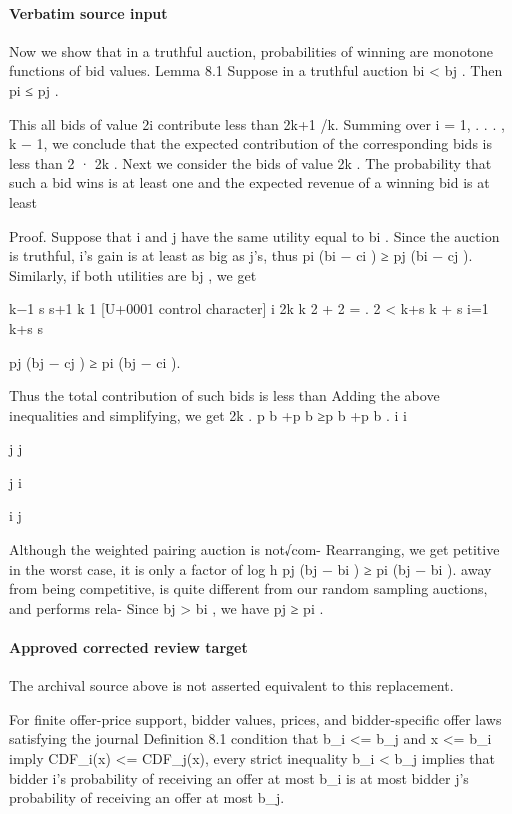 \documentclass[10pt]{article}
\begin{document}
\paragraph{Verbatim source input}
\begin{ReviewVerbatim}
Now we show that in a truthful auction, probabilities of winning are monotone functions of bid values.
Lemma 8.1 Suppose in a truthful auction bi < bj .
Then pi ≤ pj .

This all bids of value 2i contribute less than 2k+1 /k.
Summing over i = 1, . . . , k − 1, we conclude that
the expected contribution of the corresponding bids
is less than 2 · 2k .
Next we consider the bids of value 2k . The probability that such a bid wins is at least one and the
expected revenue of a winning bid is at least

Proof. Suppose that i and j have the same utility
equal to bi . Since the auction is truthful, i’s gain is
at least as big as j’s, thus
pi (bi − ci ) ≥ pj (bi − cj ).
Similarly, if both utilities are bj , we get

k−1
s
s+1 k
1 [U+0001 control character] i
2k
k
2 +
2 =
.
2 <
k+s
k + s i=1
k+s
s

pj (bj − cj ) ≥ pi (bj − ci ).

Thus the total contribution of such bids is less than Adding the above inequalities and simplifying, we get
2k .
p b +p b ≥p b +p b .
i i

j j

j i

i j

Although the weighted pairing auction is not√com- Rearranging, we get
petitive in the worst case, it is only a factor of log h
pj (bj − bi ) ≥ pi (bj − bi ).
away from being competitive, is quite different from
our random sampling auctions, and performs rela- Since bj > bi , we have pj ≥ pi .
\end{ReviewVerbatim}

\paragraph{Approved corrected review target}
The archival source above is not asserted equivalent to this replacement.
\begin{ReviewVerbatim}
For finite offer-price support, bidder values, prices, and bidder-specific offer laws satisfying the journal Definition 8.1 condition that b_i <= b_j and x <= b_i imply CDF_i(x) <= CDF_j(x), every strict inequality b_i < b_j implies that bidder i's probability of receiving an offer at most b_i is at most bidder j's probability of receiving an offer at most b_j.
\end{ReviewVerbatim}
\end{document}
